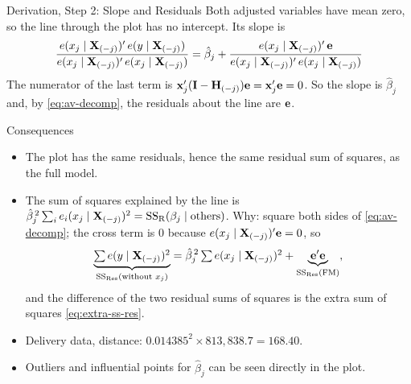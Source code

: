 \begin{frame}{Derivation, Step 2: Slope and Residuals}
    Both adjusted variables have mean zero, so the line through the plot has no intercept. Its slope is
    \begin{align*}
        \frac{e(x_j\mid\mathbf{X}_{(-j)})'\,e(y\mid\mathbf{X}_{(-j)})}{e(x_j\mid\mathbf{X}_{(-j)})'\,e(x_j\mid\mathbf{X}_{(-j)})}
        = \hat\beta_j + \frac{e(x_j\mid\mathbf{X}_{(-j)})'\,\mathbf{e}}{e(x_j\mid\mathbf{X}_{(-j)})'\,e(x_j\mid\mathbf{X}_{(-j)})}
    \end{align*}
    The numerator of the last term is $\mathbf{x}_j'(\mathbf{I}-\mathbf{H}_{(-j)})\mathbf{e}=\mathbf{x}_j'\mathbf{e}=0$. So the slope is $\hat\beta_j$ and, by \eqref{eq:av-decomp}, the residuals about the line are $\mathbf{e}$.
\end{frame}


\begin{frame}{Consequences}
    \begin{itemize}
        \item The plot has the same residuals, hence the same residual sum of squares, as the full model.
        \item The sum of squares explained by the line is $\hat\beta_j^{\,2}\sum_i e_i(x_j\mid\mathbf{X}_{(-j)})^2=\mathrm{SS}_{\mathrm{R}}(\beta_j\mid\text{others})$. Why: square both sides of \eqref{eq:av-decomp}; the cross term is $0$ because $e(x_j\mid\mathbf{X}_{(-j)})'\mathbf{e}=0$, so
        \[
        \underbrace{\textstyle\sum e(y\mid\mathbf{X}_{(-j)})^2}_{\mathrm{SS}_{\mathrm{Res}}(\text{without }x_j)} = \hat\beta_j^{\,2}\textstyle\sum e(x_j\mid\mathbf{X}_{(-j)})^2 + \underbrace{\mathbf{e}'\mathbf{e}}_{\mathrm{SS}_{\mathrm{Res}}(\mathrm{FM})},
        \]
        and the difference of the two residual sums of squares is the extra sum of squares \eqref{eq:extra-ss-res}.
        \item Delivery data, distance: $0.014385^2\times813{,}838.7=168.40$.
        \item Outliers and influential points for $\hat\beta_j$ can be seen directly in the plot.
    \end{itemize}
\end{frame}


